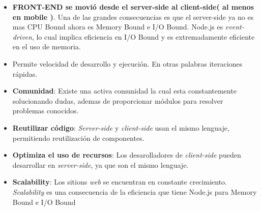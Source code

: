 \begin{itemize}
	\item \textbf{FRONT-END se movió desde el server-side al client-side( al menos en mobile )}. Una de las grandes consecuencias es que el server-side ya no es mas CPU Bound ahora es Memory Bound e I/O Bound. Node.js es \textit{event-driven}, lo cual implica eficiencia en I/O Bound y es extremadamente eficiente en el uso de memoria.
	\item Permite velocidad de desarrollo y ejecución. En otras palabras iteraciones rápidas.
	\item \textbf{Comunidad}: Existe una activa comunidad la cual esta constantemente solucionando dudas, ademas de proporcionar módulos para resolver problemas conocidos.
	\item \textbf{Reutilizar código}: \textit{Server-side} y \textit{client-side} usan el mismo lenguaje, permitiendo reutilización de componentes.
	\item \textbf{Optimiza el uso de recursos}: Los desarolladores de \textit{client-side} pueden desarrollar en \textit{server-side}, ya que son el mismo lenguaje.
	\item \textbf{Scalability}: Los sitions \textit{web} se encuentran en constante crecimiento. \textit{Scalability} es una consecuencia de la eficiencia que tiene Node.js para Memory Bound e I/O Bound
\end{itemize}

